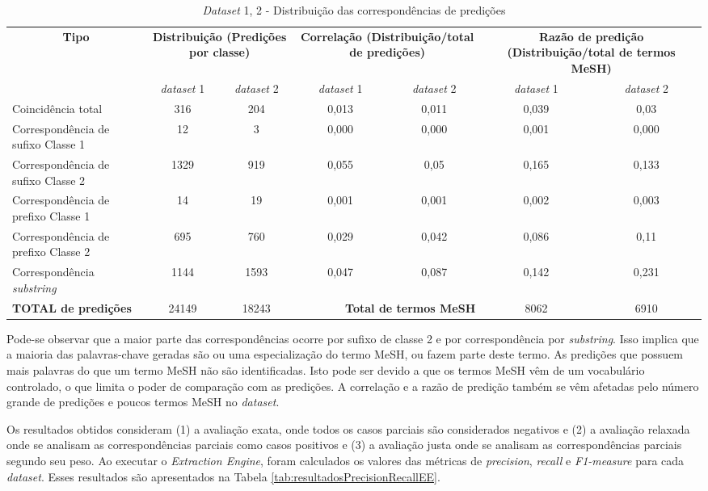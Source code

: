 \begin{table}[htbp]
\begin{center}
\begin{tabular}{|p{3cm}|c|c|c|c|c|c|}
\hline
\multicolumn{ 1}{|c|}{\textbf{Tipo}} & \multicolumn{ 2}{p{3cm}|}{\textbf{Distribuição (Predições por classe)}} & \multicolumn{ 2}{p{3cm}|}{\textbf{Correlação (Distribuição/total de predições)}} & \multicolumn{ 2}{p{3cm}|}{\textbf{Razão de predição (Distribuição/total de termos MeSH)}} \\ \cline{ 2- 7}
\multicolumn{ 1}{|l|}{} & \emph{dataset} 1 & \emph{dataset} 2 & \emph{dataset} 1 & \emph{dataset} 2 & \emph{dataset} 1 & \emph{dataset} 2 \\ \hline
Coincidência total & 316 & 204 & 0,013 & 0,011 & 0,039 & 0,03 \\ \hline
Correspondência de sufixo Classe 1 & 12 & 3 & 0,000 & 0,000 & 0,001 & 0,000 \\ \hline
Correspondência de sufixo Classe 2 & 1329 & 919 & 0,055 & 0,05 & 0,165 & 0,133 \\ \hline
Correspondência de prefixo Classe 1 & 14 & 19 & 0,001 & 0,001 & 0,002 & 0,003 \\ \hline
Correspondência de prefixo Classe 2 & 695 & 760 & 0,029 & 0,042 & 0,086 & 0,11 \\ \hline
Correspondência \emph{substring}  & 1144 & 1593 & 0,047 & 0,087 & 0,142 & 0,231 \\ \hline
\textbf{TOTAL de predições} & 24149 & 18243 & \multicolumn{ 2}{r|}{\textbf{Total de termos MeSH}} & 8062 & 6910 \\ \hline
\end{tabular}
\end{center}
\caption{\emph{Dataset} 1, 2 - Distribuição das correspondências de predições}
\label{tab:distribuicaoJusta}
\end{table}

Pode-se observar que a maior parte das correspondências ocorre por sufixo de classe 2 e por correspondência por \emph{substring}. Isso implica que a maioria das palavras-chave geradas são ou uma especialização do termo MeSH, ou fazem parte deste termo. As predições que possuem mais palavras do que um termo MeSH não são identificadas. Isto pode ser devido a que os termos MeSH vêm de um vocabulário controlado, o que limita o poder de comparação com as predições. A correlação e a razão de predição também se vêm afetadas pelo número grande de predições e poucos termos MeSH no \emph{dataset}.

Os resultados obtidos consideram (1) a avaliação exata, onde todos os casos parciais são considerados negativos e (2) a avaliação relaxada onde se analisam as correspondências parciais como casos positivos e (3) a avaliação justa onde se analisam as correspondências parciais segundo seu peso. Ao executar o \emph{Extraction Engine}, foram calculados os valores das métricas de \emph{precision}, \emph{recall} e \emph{F1-measure} para cada \emph{dataset}. Esses resultados são apresentados na Tabela \ref{tab:resultadosPrecisionRecallEE}.

